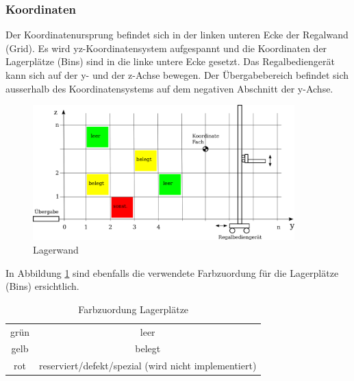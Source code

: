 \subsubsection{Koordinaten}
Der Koordinatenursprung befindet sich in der linken unteren Ecke der Regalwand (Grid). Es wird yz-Koordinatensystem aufgespannt und die Koordinaten der Lagerplätze (Bins) sind in die linke untere Ecke gesetzt. Das Regalbediengerät kann sich auf der y- und der z-Achse bewegen. Der Übergabebereich befindet sich ausserhalb des Koordinatensystems auf dem negativen Abschnitt der y-Achse. 
%
\begin{figure}[h]
  \begin{center}
    \includegraphics[width=0.9\textwidth]{images/koordinaten-wand.png}
    \caption{Lagerwand}
    \label{fig:wand}
  \end{center}
\end{figure}
%
In Abbildung \ref{fig:wand} sind ebenfalls die verwendete Farbzuordung für die Lagerplätze (Bins) ersichtlich.
%
\begin{table}
  \caption{Farbzuordung Lagerplätze}
  \label{tab:bin-color}

  \begin{center}
    \begin{tabular}{cc}
       grün & leer\\
       gelb & belegt\\
       rot & reserviert/defekt/spezial (wird nicht implementiert) \\
    \end{tabular}
  \end{center}
\end{table}

%
